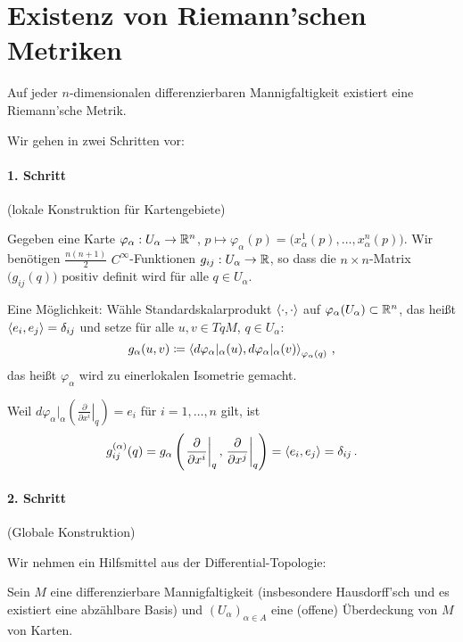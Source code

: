 \documentclass[a4paper,twoside,DIV15,BCOR12mm]{scrbook}
\renewcommand{\da}{\coloneqq}
\begin{document}
\section{Existenz von Riemann’schen Metriken}

\begin{satz}
Auf jeder $n$-dimensionalen differenzierbaren Mannigfaltigkeit existiert eine Riemann’sche Metrik.
\label{exriemet}
\end{satz}

\begin{beweis}
Wir gehen in zwei Schritten vor: %
\paragraph*{1. Schritt} (lokale Konstruktion für Kartengebiete)

Gegeben eine Karte $\varphi_\alpha: U_\alpha \to \mathbb{R}^n$, $p\mapsto \varphi_\alpha(p) = \big(x^1_\alpha(p),\ldots,x^n_\alpha(p)\big)$. Wir benötigen $\frac{n(n+1)}2$ $C^\infty$-Funktionen $g_{ij}: U_\alpha \to \mathbb{R}$, so dass die $n\times n$-Matrix $\big(g_{ij}(q)\big)$ positiv definit wird für alle $q\in U_\alpha$.

Eine Möglichkeit: Wähle Standardskalarprodukt $\langle\cdot,\cdot\rangle$ auf $\varphi_\alpha(U_\alpha)\subset \mathbb{R}^n$, das heißt $\langle e_i,e_j\rangle = \delta_{ij}$ und setze für alle $u,v\in TqM$, $q\in U_\alpha$:
\[
g_\alpha(u,v) \da \lsp {d\varphi_{\alpha}|_\alpha(u)} {d\varphi_{\alpha}|_\alpha(v)} _{\varphi_\alpha(q)}\,,
\]
das heißt $\varphi_\alpha$ wird zu einerlokalen Isometrie gemacht.

Weil $d\varphi_\alpha|_\alpha (\left.\frac\partial{\partial x^i}\right|_q) = e_i$ für $i=1,\ldots,n$ gilt, ist
\[
g_{ij}^{(\alpha)}(q) = g_\alpha\left( \left.\frac\partial{\partial x^i}\right|_q, \left.\frac\partial{\partial x^j}\right|_q \right) = \langle e_i,e_j\rangle = \delta_{ij}\,.
\]

\paragraph*{2. Schritt} (Globale Konstruktion)

Wir nehmen ein Hilfsmittel aus der Differential-Topologie:
\begin{satz}
\label{einszerl}
Sein $M$ eine differenzierbare Mannigfaltigkeit (insbesondere Hausdorff’sch und es existiert eine abzählbare Basis) und $(U_\alpha)_{\alpha\in A}$ eine (offene) Überdeckung von $M$ von Karten.


\end{satz}
\end{beweis}
\end{document}
